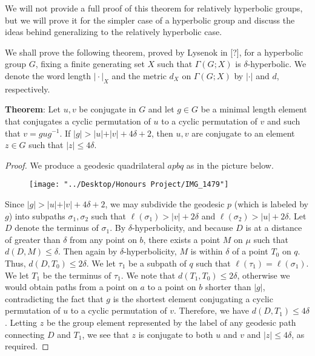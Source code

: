 \documentclass[12pt]{article}
\newcommand{\vs}{\vskip10pt}
\begin{document}
	\vs 
	
	We will not provide a full proof of this theorem for relatively hyperbolic groups, but we will prove it for the simpler case of a hyperbolic group and discuss the ideas behind generalizing to the relatively hyperbolic case. 
	
	\vs 
	
	We shall prove the following theorem, proved by Lysenok in [?], for a hyperbolic group $G$, fixing a finite generating set $X$ such that $\Gamma(G;X)$ is $\delta$-hyperbolic. We denote the word length $\vert \cdot \vert_X$ and the metric $d_X$ on $\Gamma(G;X)$ by $\vert \cdot \vert$ and $d$, respectively. 
	
	\vs 
	
	\textbf{Theorem}: Let $u,v$ be conjugate in $G$ and let $g \in G$ be a minimal length element that conjugates a cyclic permutation of $u$ to a cyclic permutation of $v$ and such that $v = g u g^{-1}$. If $\vert g \vert > \vert u \vert + \vert v \vert + 4 \delta + 2$, then $u,v$ are conjugate to an element $z \in G$ such that $\vert z \vert \leq 4 \delta$.
	
	\begin{proof}
		
		We produce a geodesic quadrilateral $apbq$ as in the picture below. 
		
		\vs 
		
		
\begin{figure}
	\centering
	\texttt{[image: "../Desktop/Honours Project/IMG\_1479"]}
	\caption{}
	\label{fig:img1479}
\end{figure}
		
		\vs 
		
		Since $\vert g \vert > \vert u \vert + \vert v \vert + 4 \delta + 2$, we may subdivide the geodesic $p$ (which is labeled by $g$) into subpaths $\sigma_1, \sigma_2$ such that $\ell(\sigma_1) > \vert v \vert + 2 \delta$ and $\ell(\sigma_2) > \vert u \vert + 2 \delta$. Let $D$ denote the terminus of $\sigma_1$. By $\delta$-hyperbolicity, and because $D$ is at a distance of greater than $\delta$ from any point on $b$, there exists a point $M$ on $\mu$ such that $d(D,M) \leq \delta$. Then again by $\delta$-hyperbolicity, $M$ is within $\delta$ of a point $T_0$ on $q$. Thus, $d(D, T_0) \leq 2 \delta$. We let $\tau_1$ be a subpath of $q$ such that $\ell(\tau_1) = \ell(\sigma_1)$. We let $T_1$ be the terminus of $\tau_1$. We note that $d(T_1, T_0) \leq 2 \delta$, otherwise we would obtain paths from a point on $a$ to a point on $b$ shorter than $\vert g \vert$, contradicting the fact that $g$ is the shortest element conjugating a cyclic permutation of $u$ to a cyclic permutation of $v$. Therefore, we have $d(D, T_1) \leq 4 \delta$. Letting $z$ be the group element represented by the label of any geodesic path connecting $D$ and $T_1$, we see that $z$ is conjugate to both $u$ and $v$ and $\vert z \vert \leq 4 \delta$, as required. 
		
	\end{proof}
	
\end{document}
